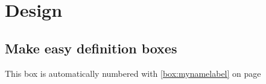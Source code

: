 \chapter{Design}\label{chap:design}

\section{Make easy definition boxes}


This box is automatically numbered with \ref{box:mynamelabel} on page
